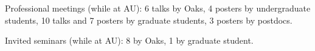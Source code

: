 \begin{veryTightItemize}
    \item Professional meetings (while at AU): 6 talks by Oaks,
        4 posters by undergraduate students,
        10 talks and 7 posters by graduate students,
        3 posters by postdocs.
    \item Invited seminars (while at AU): 8 by Oaks, 1 by graduate student.
\end{veryTightItemize}
